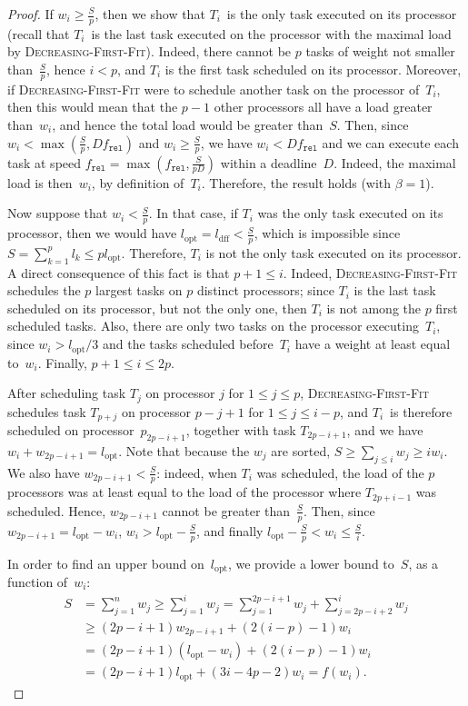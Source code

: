 \documentclass[a4paper]{article}
\theoremstyle{plain}
\theoremstyle{definition}
\theoremstyle{remark}
\newcommand{\fr}{\ensuremath{f_{\texttt{rel}}}\xspace}
\newcommand{\dff}{\textsc{Dec\-reasing-First-Fit}\xspace}
\begin{document}
\begin{proof}
If $w_i \geq \frac{S}{p}$, then we show that $T_i$~is the only task executed on its processor (recall that $T_i$~is
the last task executed on the processor with the maximal load by
\dff). Indeed,
there cannot be $p$ tasks of weight not smaller than~$\frac{S}{p}$,
hence $i<p$, and $T_i$ is the first task scheduled on its
processor. Moreover, 
if \dff were to schedule another task on the processor of~$T_i$,
  then this would mean that the $p-1$ other processors all have a load
  greater than~$w_i$, and hence the total load would be 
  greater than~$S$. 
Then, since $w_i< \max(\frac{S}{p},D\fr)$ and $w_i\geq \frac{S}{p}$,
we have $w_i < D\fr$ and we can execute each task at speed $\fr =
\max(\fr,\frac{S}{pD})$ within a deadline~$D$. Indeed, the maximal
load is then~$w_i$, by definition of~$T_i$. Therefore, the result
holds (with $\beta=1$).

Now suppose that $w_i < \frac{S}{p}$. In that case, if $T_i$ was the
only task executed on its processor, then we would have
$l_{\text{opt}} = l_{\text{dff}} < \frac{S}{p}$, which is impossible
since $S = \sum_{k=1}^p l_k \leq p l_{\text{opt}}$.  Therefore, $T_i$
is not the only task executed on its processor.  A direct consequence
of this fact is that $p+1 \leq i$. Indeed, \dff schedules the $p$
largest tasks on $p$ distinct processors; since $T_i$ is the last
task scheduled on its processor, but not the only one, then $T_i$ is
not among the $p$ first scheduled tasks. Also, there are only two
tasks on the processor executing~$T_i$, since $w_i> l_{\text{opt}}/3$
and the tasks scheduled before~$T_i$ have a weight at least equal
to~$w_i$. Finally, $p+1\leq i \leq 2p$. 

After scheduling task $T_j$ on processor $j$ for $1 \leq j \leq p$,
\dff schedules task $T_{p+j}$ on processor $p-j+1$ for $1 \leq j \leq
i-p$, and $T_i$~is therefore scheduled on processor~$p_{2p-i+1}$,
together with task $T_{2p-i+1}$, and we have   
$w_i+w_{2p-i+1} = l_{\text{opt}}$.
Note that because the $w_j$ are sorted, $S\geq \sum_{j\leq i}w_j \geq i w_i$. 
We also have $w_{2p-i+1} < \frac{S}{p}$: indeed, when $T_i$ was
scheduled, the load of the $p$ processors was at least equal to the
load of the processor where $T_{2p+i-1}$ was scheduled. Hence, 
$w_{2p-i+1}$ cannot be greater than~$\frac{S}{p}$.  Then, since
$w_{2p-i+1} =l_{\text{opt}}-w_i$,  $w_i > l_{\text{opt}} -
\frac{S}{p}$, and finally $l_{\text{opt}} - \frac{S}{p} < w_i \leq \frac{S}{i}$. 

In order to find an upper bound on~$l_{\text{opt}}$, we provide a
lower bound to~$S$, as a function of~$w_i$: 
\begin{align*}
S & = \sum_{j=1}^n w_j \geq \sum_{j=1}^i w_j = \sum_{j=1}^{2p-i+1} w_j + \sum_{j=2p-i+2}^i w_j \\
 &\geq (2p-i+1) w_{2p-i+1} + (2(i-p)-1)w_i \\
 & = (2p-i+1) (l_{\text{opt}}-w_i) + (2(i-p)-1)w_i \\
 &= (2p-i+1) l_{\text{opt}} + (3i-4p-2) w_i = f(w_i). 
\end{align*}


\end{proof}
\end{document}
